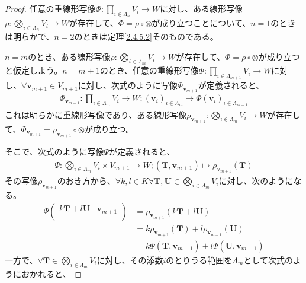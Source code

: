 \documentclass[dvipdfmx]{jsarticle}
\begin{document}
\begin{proof}
任意の重線形写像$\varPhi:\prod_{i \in \varLambda_{n}} V_{i} \rightarrow W$に対し、ある線形写像$\rho:\bigotimes_{i \in \varLambda_{n}} V_{i} \rightarrow W$が存在して、$\varPhi = \rho \circ \otimes$が成り立つことについて、$n = 1$のときは明らかで、$n = 2$のときは定理\ref{2.4.5.2}そのものである。\par
$n = m$のとき、ある線形写像$\rho:\bigotimes_{i \in \varLambda_{m}} V_{i} \rightarrow W$が存在して、$\varPhi = \rho \circ \otimes$が成り立つと仮定しよう。$n = m + 1$のとき、任意の重線形写像$\varPhi:\prod_{i \in \varLambda_{m + 1}} V_{i} \rightarrow W$に対し、$\forall\mathbf{v}_{m + 1} \in V_{m + 1}$に対し、次式のように写像$\varPhi_{\mathbf{v}_{m + 1}}$が定義されると、
\begin{align*}
\varPhi_{\mathbf{v}_{m + 1}}:\prod_{i \in \varLambda_{m}} V_{i} \rightarrow W;\left( \mathbf{v}_{i} \right)_{i \in \varLambda_{m}} \mapsto \varPhi\left( \mathbf{v}_{i} \right)_{i \in \varLambda_{m + 1}}
\end{align*}
これは明らかに重線形写像であり、ある線形写像$\rho_{\mathbf{v}_{m + 1}}:\bigotimes_{i \in \varLambda_{m}} V_{i} \rightarrow W$が存在して、$\varPhi_{\mathbf{v}_{m + 1}} = \rho_{\mathbf{v}_{m + 1}} \circ \otimes$が成り立つ。\par
そこで、次式のように写像$\varPsi$が定義されると、
\begin{align*}
\varPsi:\bigotimes_{i \in \varLambda_{m}} V_{i} \times V_{m + 1} \rightarrow W;\left( \mathbf{T},\mathbf{v}_{m + 1} \right) \mapsto \rho_{\mathbf{v}_{m + 1}}\left( \mathbf{T} \right)
\end{align*}
その写像$\rho_{\mathbf{v}_{m + 1}}$のおき方から、$\forall k,l \in K\forall\mathbf{T},\mathbf{U} \in \bigotimes_{i \in \varLambda_{m}} V_{i}$に対し、次のようになる。
\begin{align*}
\varPsi\begin{pmatrix}
k\mathbf{T} + l\mathbf{U} & \mathbf{v}_{m + 1} \\
\end{pmatrix} &= \rho_{\mathbf{v}_{m + 1}}\left( k\mathbf{T} + l\mathbf{U} \right)\\
&= k\rho_{\mathbf{v}_{m + 1}}\left( \mathbf{T} \right) + l\rho_{\mathbf{v}_{m + 1}}\left( \mathbf{U} \right)\\
&= k\varPsi\left( \mathbf{T},\mathbf{v}_{m + 1} \right) + l\varPsi\left( \mathbf{U},\mathbf{v}_{m + 1} \right)
\end{align*}
一方で、$\forall\mathbf{T} \in \bigotimes_{i \in \varLambda_{m}} V_{i}$に対し、その添数$i$のとりうる範囲を$\varLambda_{m}$として次式のようにおかれると、

\end{proof}
\end{document}
